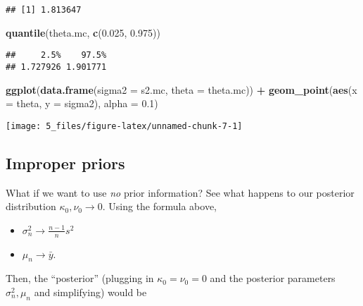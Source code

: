 \documentclass[]{article}
\newenvironment{Shaded}{\begin{snugshade}}{\end{snugshade}}
\newcommand{\DataTypeTok}[1]{\textcolor[rgb]{0.13,0.29,0.53}{#1}}
\newcommand{\FloatTok}[1]{\textcolor[rgb]{0.00,0.00,0.81}{#1}}
\newcommand{\KeywordTok}[1]{\textcolor[rgb]{0.13,0.29,0.53}{\textbf{#1}}}
\newcommand{\NormalTok}[1]{#1}
\newcommand{\OperatorTok}[1]{\textcolor[rgb]{0.81,0.36,0.00}{\textbf{#1}}}
\newcommand{\StringTok}[1]{\textcolor[rgb]{0.31,0.60,0.02}{#1}}
\providecommand{\tightlist}{%
  \setlength{\itemsep}{0pt}\setlength{\parskip}{0pt}}
\begin{document}
\begin{verbatim}
## [1] 1.813647
\end{verbatim}

\begin{Shaded}
\begin{Highlighting}[]
\KeywordTok{quantile}\NormalTok{(theta.mc, }\KeywordTok{c}\NormalTok{(}\FloatTok{0.025}\NormalTok{, }\FloatTok{0.975}\NormalTok{))}
\end{Highlighting}
\end{Shaded}

\begin{verbatim}
##     2.5%    97.5% 
## 1.727926 1.901771
\end{verbatim}

\begin{Shaded}
\begin{Highlighting}[]
\KeywordTok{ggplot}\NormalTok{(}\KeywordTok{data.frame}\NormalTok{(}\DataTypeTok{sigma2 =}\NormalTok{ s2.mc, }\DataTypeTok{theta =}\NormalTok{ theta.mc)) }\OperatorTok{+}
\StringTok{  }\KeywordTok{geom_point}\NormalTok{(}\KeywordTok{aes}\NormalTok{(}\DataTypeTok{x =}\NormalTok{ theta, }\DataTypeTok{y =}\NormalTok{ sigma2), }\DataTypeTok{alpha =} \FloatTok{0.1}\NormalTok{)}
\end{Highlighting}
\end{Shaded}

\begin{center}\texttt{[image: 5\_files/figure-latex/unnamed-chunk-7-1]} \end{center}

\hypertarget{improper-priors}{%
\subsection{Improper priors}\label{improper-priors}}

What if we want to use \emph{no} prior information? See what happens to
our posterior distribution \(\kappa_0, \nu_0 \rightarrow 0\). Using the
formula above,

\begin{itemize}
\tightlist
\item
  \(\sigma_n^2 \rightarrow \frac{n - 1}{n}s^2\)
\item
  \(\mu_n \rightarrow \bar{y}\).
\end{itemize}

Then, the ``posterior'' (plugging in \(\kappa_0 = \nu_0 = 0\) and the
posterior parameters \(\sigma_n^2, \mu_n\) and simplifying) would be
\end{document}
